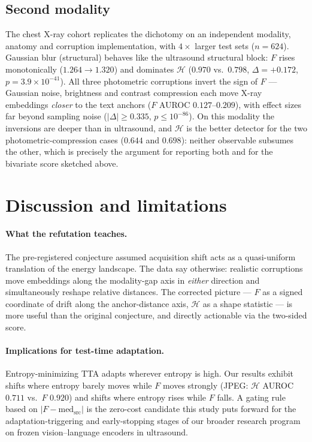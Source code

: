 \documentclass[11pt]{article}
\newcommand{\Hent}{\mathcal{H}}
\begin{document}
\subsection{Second modality}
\label{sec:pneumonia}

The chest X-ray cohort replicates the dichotomy on an independent modality,
anatomy and corruption implementation, with $4\times$ larger test sets
($n=624$). Gaussian blur (structural) behaves like the ultrasound structural
block: $F$ rises monotonically ($1.264\!\to\!1.320$) and dominates $\Hent$
($0.970$ vs.\ $0.798$, $\Delta=+0.172$, $p=3.9\times10^{-41}$). All three
photometric corruptions invert the sign of $F$ --- Gaussian noise, brightness
and contrast compression each move X-ray embeddings \emph{closer} to the text
anchors ($F$ AUROC $0.127$--$0.209$), with effect sizes far beyond sampling
noise ($|\Delta|\ge 0.335$, $p\le 10^{-86}$). On this modality the inversions
are deeper than in ultrasound, and $\Hent$ is the better detector for the two
photometric-compression cases ($0.644$ and $0.698$): neither observable
subsumes the other, which is precisely the argument for reporting both and for
the bivariate score sketched above.

\section{Discussion and limitations}
\label{sec:discussion}

\paragraph{What the refutation teaches.} The pre-registered conjecture assumed
acquisition shift acts as a quasi-uniform translation of the energy landscape.
The data say otherwise: realistic corruptions move embeddings along the
modality-gap axis in \emph{either} direction and simultaneously reshape
relative distances. The corrected picture --- $F$ as a signed coordinate of
drift along the anchor-distance axis, $\Hent$ as a shape statistic --- is more
useful than the original conjecture, and directly actionable via the two-sided
score.

\paragraph{Implications for test-time adaptation.} Entropy-minimizing TTA
\citep{wang2021tent,shu2022tpt} adapts wherever entropy is high. Our results
exhibit shifts where entropy barely moves while $F$ moves strongly (JPEG:
$\Hent$ AUROC $0.711$ vs.\ $F$ $0.920$) and shifts where entropy rises while
$F$ falls. A gating rule based on $|F-\mathrm{med}_{\mathrm{src}}|$ is the
zero-cost candidate this study puts forward for the adaptation-triggering and
early-stopping stages of our broader research program on frozen
vision--language encoders in ultrasound.
\end{document}
